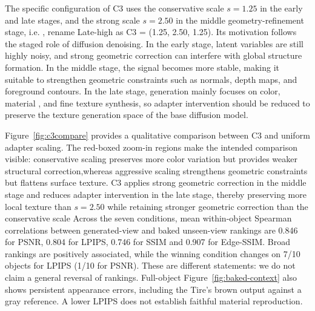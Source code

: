 \documentclass[times,twocolumn,final]{elsarticle}
\providecommand{\DIFadd}[1]{{\protect\color{blue} \sf #1}} %
\providecommand{\DIFdel}[1]{{\protect\color{red} \scriptsize #1}} %
\providecommand{\DIFaddbegin}{} %
\providecommand{\DIFaddend}{} %
\providecommand{\DIFdelbegin}{} %
\providecommand{\DIFdelend}{} %
\begin{document}
\DIFdel{The specific configuration of C3 uses the conservative scale $s = 1.25$ in the early and late stages, and the strong scale $s = 2.50$ in the middle geometry-refinement stage, i.e. , }\DIFdelend \DIFaddbegin \DIFadd{rename Late-high as }\DIFaddend C3\DIFdelbegin \DIFdel{= (1.25, 2.50, 1.25). Its motivation follows the staged role of diffusion denoising. In the early stage, latent variables are still highly noisy, and strong geometric correction can interfere with global structure formation. In the middle stage, the signal becomes more stable, making it suitable to strengthen geometric constraints such as normals, depth maps, and foreground contours. In the late stage, generation mainly focuses on color, material , and fine texture synthesis, so adapter intervention should be reduced to preserve the texture generation space of the base diffusion model}\DIFdelend .

\DIFdelbegin \DIFdel{Figure~\ref{fig:c3compare} provides a qualitative comparison between C3 and uniform adapter scaling. The red-boxed zoom-in regions make the intended comparison visible: conservative scaling preserves more color variation but provides weaker structural correction,whereas aggressive scaling strengthens geometric constraints but flattens surface texture. C3 applies strong geometric correction in the middle stage and reduces adapter intervention in the late stage, thereby preserving more local texture than $s = 2.50$ while retaining stronger geometric correction than the conservative scale}\DIFdelend \DIFaddbegin \DIFadd{Across the seven conditions, mean within-object Spearman correlations between generated-view and baked unseen-view rankings are 0.846 for PSNR, 0.804 for LPIPS, 0.746 for SSIM and 0.907 for Edge-SSIM. Broad rankings are positively associated, while the winning condition changes on 7/10 objects for LPIPS (1/10 for PSNR). These are different statements: we do not claim a general reversal of rankings. Full-object Figure~\ref{fig:baked-context} also shows persistent appearance errors, including the Tire's brown output against a gray reference. A lower LPIPS does not establish faithful material reproduction}\DIFaddend .
\end{document}
